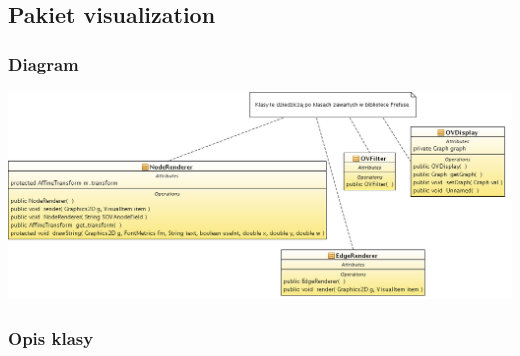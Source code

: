 \begin{center}
\begin{longtable}{|m{3cm}|m{9cm}|}


\end{longtable}

\end{center}

\subsection{Pakiet visualization }

\subsubsection{Diagram}

\includegraphics[width=\linewidth]{./modelowanie/OV_UML/VisualizationClassDiagram.png}

\subsubsection{Opis klasy}


